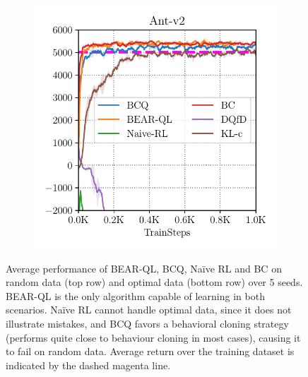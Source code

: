 \begin{figure}[t!]
\begin{subfigure}[t]{0.23\textwidth}
        \includegraphics[width=0.99\linewidth]{chapters/bear/images/images_camera_ready/ant_optimal_camera_ready.pdf}
    \end{subfigure}
    \caption{\footnotesize Average performance of BEAR-QL, BCQ, Na\"ive RL and BC on random data (top row) and optimal data (bottom row) over 5 seeds. BEAR-QL is the only algorithm capable of learning in both scenarios. Na\"{i}ve RL cannot handle optimal data, since it does not illustrate mistakes, and BCQ favors a behavioral cloning strategy (performs quite close to behaviour cloning in most cases), causing it to fail on random data. Average return over the training dataset is indicated by the dashed magenta line.}
    \label{fig:optimal_random}
    \vspace{-0.1in}
\end{figure}

